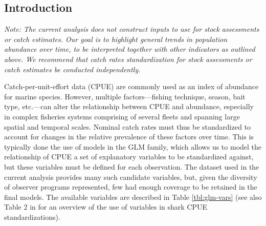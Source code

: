 
%




\subsection{Introduction}
\emph{Note: The current analysis does not construct inputs to use for stock assessments or catch estimates. Our goal is to highlight general trends in population abundance over time, to be interpreted together with other indicators as outlined above. We recommend that catch rates standardization for stock assessments or catch estimates be conducted independently.}


Catch-per-unit-effort data (CPUE) are commonly used as an index of abundance for marine species. However, multiple factors---fishing technique, season, bait type, etc.---can alter the relationship between CPUE and abundance, especially in complex fisheries systems comprising of several fleets and spanning large spatial and temporal scales. Nominal catch rates must thus be standardized to account for changes in the relative prevalence of these factors over time. This is typically done \via the use of models in the GLM family, which allows us to model the relationship of CPUE \vs a set of explanatory variables to be standardized against, but these variables must be defined for each observation. The dataset used in the current analysis provides many such candidate variables, but, given the diversity of observer programs represented, few had enough coverage to be retained in the final models. The available variables are described in Table \ref{tbl:glm-vars} (see also Table 2 in \citealt{Francis2014_a} for an overview of the use of variables in shark CPUE standardizations).

